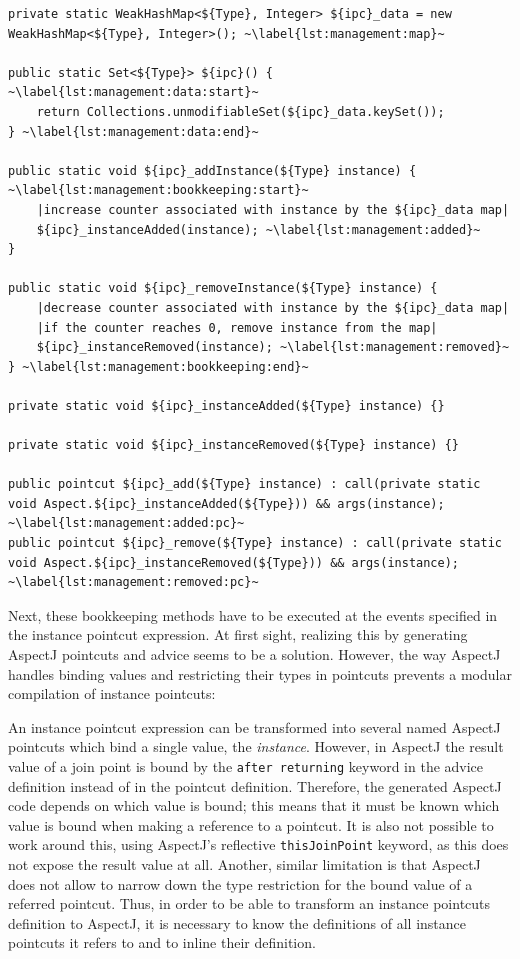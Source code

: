 \documentclass{acm_proc_article-sp}
\begin{document}
\begin{lstlisting}[float, caption={Template of generated code for instance set management.},label=lst:management]
private static WeakHashMap<${Type}, Integer> ${ipc}_data = new WeakHashMap<${Type}, Integer>(); ~\label{lst:management:map}~

public static Set<${Type}> ${ipc}() { ~\label{lst:management:data:start}~
	return Collections.unmodifiableSet(${ipc}_data.keySet());
} ~\label{lst:management:data:end}~

public static void ${ipc}_addInstance(${Type} instance) { ~\label{lst:management:bookkeeping:start}~
	|increase counter associated with instance by the ${ipc}_data map|
	${ipc}_instanceAdded(instance); ~\label{lst:management:added}~
}

public static void ${ipc}_removeInstance(${Type} instance) {
	|decrease counter associated with instance by the ${ipc}_data map|
	|if the counter reaches 0, remove instance from the map|
	${ipc}_instanceRemoved(instance); ~\label{lst:management:removed}~
} ~\label{lst:management:bookkeeping:end}~

private static void ${ipc}_instanceAdded(${Type} instance) {}

private static void ${ipc}_instanceRemoved(${Type} instance) {}

public pointcut ${ipc}_add(${Type} instance) : call(private static void Aspect.${ipc}_instanceAdded(${Type})) && args(instance); ~\label{lst:management:added:pc}~
public pointcut ${ipc}_remove(${Type} instance) : call(private static void Aspect.${ipc}_instanceRemoved(${Type})) && args(instance); ~\label{lst:management:removed:pc}~
\end{lstlisting}

Next, these bookkeeping methods have to be executed at the events specified in the instance pointcut expression.
At first sight, realizing this by generating AspectJ pointcuts and advice seems to be a solution.
However, the way AspectJ handles binding values and restricting their types in pointcuts prevents a modular compilation of instance pointcuts:

An instance pointcut expression can be transformed into several named AspectJ pointcuts which bind a single value, the \emph{instance}.
However, in AspectJ the result value of a join point is bound by the \lstinline{after returning} keyword in the advice definition instead of in the pointcut definition.
Therefore, the generated AspectJ code depends on which value is bound; this means that it must be known which value is bound when making a reference to a pointcut.
It is also not possible to work around this, using AspectJ's reflective \lstinline{thisJoinPoint} keyword, as this does not expose the result value at all.
Another, similar limitation is that AspectJ does not allow to narrow down the type restriction for the bound value of a referred pointcut.
Thus, in order to be able to transform an instance pointcuts definition to AspectJ, it is necessary to know the definitions of all instance pointcuts it refers to and to inline their definition.
\end{document}
